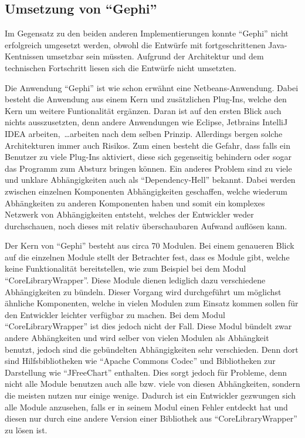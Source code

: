 \subsection{Umsetzung von \enquote{Gephi}}
Im Gegensatz zu den beiden anderen Implementierungen konnte \enquote{Gephi}
nicht erfolgreich umgesetzt werden, obwohl die Entwürfe mit fortgeschrittenen
Java-Kentnissen umsetzbar sein müssten. Aufgrund der Architektur und dem
technischen Fortschritt liesen sich die Entwürfe nicht umsetzten.

Die Anwendung \enquote{Gephi} ist wie schon erwähnt eine Netbeans-Anwendung.
Dabei besteht die Anwendung aus einem Kern und zusätzlichen Plug-Ins, welche den
Kern um weitere Funtionalität ergänzen. Daran ist auf den ersten Blick auch
nichts ausszusetzten, denn andere Anwendungen wie Eclipse,
Jetbrains IntelliJ IDEA arbeiten,~\dots arbeiten nach dem selben Prinzip.
Allerdings bergen solche Architekturen immer auch Risikos. Zum einen besteht die
Gefahr, dass falls ein Benutzer zu viele Plug-Ins aktiviert, diese sich
gegenseitig behindern oder sogar das Programm zum Absturz bringen
können. Ein anderes Problem sind zu viele und unklare Abhängigkeiten auch als
\enquote{Dependency-Hell} bekannt. Dabei werden zwischen einzelnen
Komponenten Abhängigkeiten geschaffen, welche wiederum Abhängkeiten zu anderen
Komponenten haben und somit ein komplexes Netzwerk von Abhängigkeiten entsteht,
welches der Entwickler weder durchschauen, noch dieses mit relativ überschaubaren
Aufwand auflösen kann.

Der Kern von \enquote{Gephi} besteht aus circa 70 Modulen. Bei einem genaueren
Blick auf die einzelnen Module stellt der Betrachter fest, dass es Module gibt,
welche keine Funktionalität bereitstellen, wie zum Beispiel bei dem Modul
\enquote{CoreLibraryWrapper}. Diese Module dienen lediglich dazu verschiedene
Abhängigkeiten zu bündeln. Dieser Vorgang wird durchgeführt um möglichst ähnliche
Komponenten, welche in vielen Modulen zum Einsatz kommen sollen für den Entwickler
leichter verfügbar zu machen. Bei dem Modul \enquote{CoreLibraryWrapper} ist
dies jedoch nicht der Fall. Diese Modul bündelt zwar andere Abhängkeiten und wird
selber von vielen Modulen als Abhängkeit benutzt, jedoch sind die gebündelten
Abhängigkeiten sehr verschieden. Denn dort sind Hilfsbibliotheken wie
\enquote{Apache Commons Codec} und Bibliotheken zur Darstellung wie
\enquote{JFreeChart} enthalten. Dies sorgt jedoch für Probleme, denn nicht alle
Module benutzen auch alle bzw. viele von diesen Abhängkeiten, sondern die meisten
nutzen nur einige wenige. Dadurch ist ein Entwickler gezwungen sich alle Module
anzusehen, falls er in seinem Modul einen Fehler entdeckt hat und diesen nur
durch eine andere Version einer Bibliothek aus \enquote{CoreLibraryWrapper} zu
lösen ist.


